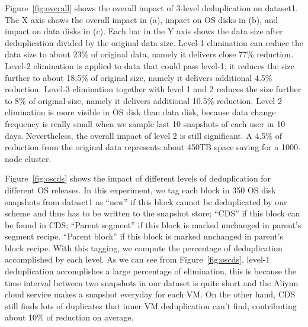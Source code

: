 Figure~\ref{fig:overall} shows the overall impact of 3-level deduplication on dataset1.
The X axis shows the overall impact in (a),  impact on OS disks in (b), and impact on data disks in (c).
Each bar in the Y axis shows the data size after deduplication divided by the original data size.
Level-1 elimination can reduce the data size to about 23\% of original data, namely it delivers close 77\% reduction.
Level-2 elimination is applied to data that could pass level-1, it
reduces the size further to about 18.5\% of original size, namely it delivers additional 4.5\% reduction.
Level-3 elimination together with level 1 and 2
reduces the size further to 8\% of original size, namely it delivers additional 10.5\% reduction.
Level 2 elimination is more visible in OS disk than data disk, because data change frequency is really small
when we sample last 10 snapshots of each user in 10 days. Nevertheless, the overall impact of level 2 is still significant.
A 4.5\% of reduction from the original data represents about 450TB space saving for a 1000-node cluster.



Figure~\ref{fig:oscds} shows the impact of different levels of deduplication for different OS releases.
In this experiment, we tag each block in 350 OS disk snapshots from dataset1 as  ``new''
if this block cannot be deduplicated by our scheme and thus has to be written to the snapshot store;
``CDS''  if this block can be found  in CDS;
``Parent segment'' if  this block is marked unchanged in parent's segment recipe.
``Parent block'' if  this block is marked unchanged in parent's block recipe.
With this tagging, we compute the percentage of deduplication accomplished by each level.
As we can see from Figure~\ref{fig:oscds}, level-1 deduplication accomplishes a large percentage of elimination,
this is because the time interval between two snapshots in our dataset
is quite short and the Aliyun cloud service makes a snapshot  everyday  for each VM.
On the other hand,  CDS still finds lots of duplicates that inner VM deduplication can't find,
contributing about 10\% of reduction on average.

